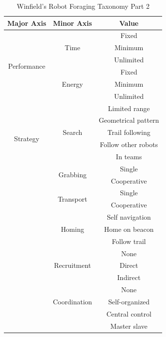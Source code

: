\begin{table}
\centering
    \caption{Winfield's Robot Foraging Taxonomy Part 2 \cite{winfield2009foraging}}
    \label{foragingtaxonomytable_part2}
    
\begin{tabular}{ | c | c | c |}
\hline
	Major Axis & Minor Axis & Value  \\ \hline
	\multirow{6}{*}{Performance}
		& \multirow{3}{*}{Time} 
			& Fixed \\  
		& 	& Minimum \\ 
		& 	& Unlimited \\ \cline{2-3}
		& \multirow{3}{*}{Energy} 
			& Fixed \\ 
		& 	& Minimum \\ 
		&	& Unlimited \\ \hline
	\multirow{6}{*}{Strategy}	
		& \multirow{5}{*}{Search} 
			& Limited range \\
		&	& Geometrical pattern\\
		&	& Trail following\\
		&	& Follow other robots\\
		&	& In teams\\ \cline{2-3}
		& \multirow{2}{*}{Grabbing} 
			& Single \\
		&	& Cooperative \\ \cline{2-3}
		& \multirow{2}{*}{Transport} 
			& Single \\
		&	& Cooperative \\ \cline{2-3}
		& \multirow{3}{*}{Homing} 
			& Self navigation \\
		&	& Home on beacon \\
		&	& Follow trail \\\cline{2-3}
		& \multirow{3}{*}{Recruitment} 
			& None \\
		&	& Direct \\
		&	& Indirect \\\cline{2-3}
		& \multirow{3}{*}{Coordination} 
			& None \\
		&	& Self-organized \\
		&	&  Central control \\
		&	& Master slave \\\hline
\end{tabular}
\end{table}

